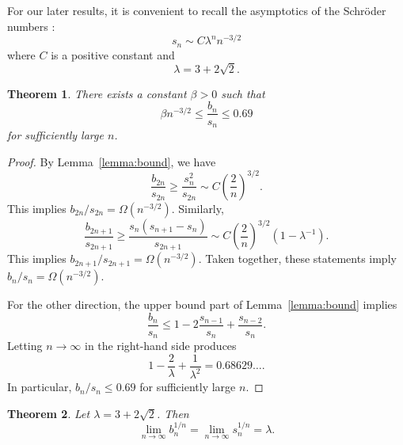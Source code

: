 \documentclass{article}
\theoremstyle{plain}
\newtheorem{theorem}{Theorem}
\theoremstyle{definition}
\theoremstyle{plain}
\begin{document}
For our later results, it is convenient to recall the asymptotics of the
Schr\"oder numbers \cite{OEISA6318}:
\begin{equation}
    \label{eq:schroder}
    s_n \sim C \lambda^n n^{-3/2}
\end{equation}
where $C$ is a positive constant and
\begin{equation*}
    \lambda = 3 + 2 \sqrt{2}.
\end{equation*}

\begin{theorem}
    There exists a constant $\beta > 0$ such that
    \begin{equation*}
        \beta n^{-3/2} \leq \frac{b_n}{s_n} \leq 0.69
    \end{equation*}
    for sufficiently large $n$.
\end{theorem}

\begin{proof}
    By Lemma~\ref{lemma:bound}, we have
    \begin{equation*}
        \frac{b_{2n}}{s_{2n}} \geq \frac{s_n^2}{s_{2n}} \sim C \left(\frac{2}{n}\right)^{3/2}.
    \end{equation*}
    This implies $b_{2n} / s_{2n} = \Omega(n^{-3/2})$. Similarly,
    \begin{equation*}
        \frac{b_{2n + 1}}{s_{2n + 1}} \geq \frac{s_n(s_{n + 1} - s_n)}{s_{2n + 1}}
        \sim C \left( \frac{2}{n} \right)^{3/2} (1 - \lambda^{-1}).
    \end{equation*}
    This implies $b_{2n + 1} / s_{2n + 1} = \Omega(n^{-3/2})$. Taken together,
    these statements imply $b_n / s_n = \Omega(n^{-3/2})$.

    For the other direction, the upper bound part of Lemma~\ref{lemma:bound}
    implies
    \begin{equation*}
        \frac{b_n}{s_n} \leq 1 - 2\frac{s_{n - 1}}{s_n} + \frac{s_{n - 2}}{s_n}.
    \end{equation*}
    Letting $n \to \infty$ in the right-hand side produces
    \begin{equation*}
        1 - \frac{2}{\lambda} + \frac{1}{\lambda^2} = 0.68629\dots.
    \end{equation*}
    In particular, $b_n / s_n \leq 0.69$ for sufficiently large $n$.
\end{proof}

\begin{theorem}
    Let $\lambda = 3 + 2 \sqrt{2}$. Then
    \begin{equation*}
        \lim_{n \to \infty} b_n^{1/n} = \lim_{n \to \infty} s_n^{1/n} = \lambda.
    \end{equation*}
\end{theorem}
\end{document}
